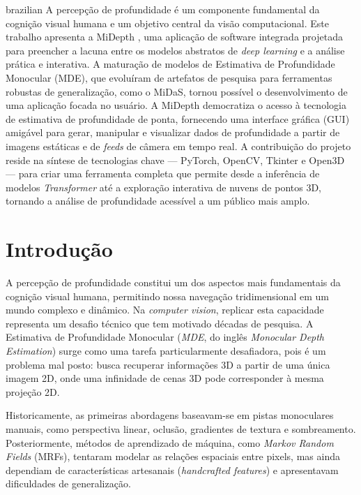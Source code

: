\documentclass{SBCbookchapter}
\newcommand{\nomeProjeto}{MiDepth }
\begin{document}
    \begin{resumo}
        \begin{otherlanguage}
            {brazilian} A percepção de profundidade é um componente fundamental da
            cognição visual humana e um objetivo central da visão computacional.
            Este trabalho apresenta a \nomeProjeto, uma aplicação de software integrada
            projetada para preencher a lacuna entre os modelos abstratos de \textit{deep
            learning} e a análise prática e interativa. A maturação de modelos de
            Estimativa de Profundidade Monocular (MDE), que evoluíram de artefatos
            de pesquisa para ferramentas robustas de generalização, como o MiDaS,
            tornou possível o desenvolvimento de uma aplicação focada no usuário.
            A \nomeProjeto democratiza o acesso à tecnologia de estimativa de profundidade
            de ponta, fornecendo uma interface gráfica (GUI) amigável para gerar,
            manipular e visualizar dados de profundidade a partir de imagens estáticas
            e de \textit{feeds} de câmera em tempo real. A contribuição do projeto
            reside na síntese de tecnologias chave — PyTorch, OpenCV, Tkinter e
            Open3D — para criar uma ferramenta completa que permite desde a inferência
            de modelos \textit{Transformer} até a exploração interativa de nuvens
            de pontos 3D, tornando a análise de profundidade acessível a um público
            mais amplo.
        \end{otherlanguage}
    \end{resumo}

    \pagebreak

    \section{Introdução}
    A percepção de profundidade constitui um dos aspectos mais fundamentais da cognição
    visual humana, permitindo nossa navegação tridimensional em um mundo
    complexo e dinâmico. Na \textit{computer vision}, replicar esta capacidade
    representa um desafio técnico que tem motivado décadas de pesquisa. A Estimativa
    de Profundidade Monocular (\textit{MDE}, do inglês \textit{Monocular Depth
    Estimation}) surge como uma tarefa particularmente desafiadora, pois é um problema
    mal posto: busca recuperar informações 3D a partir de uma única imagem 2D,
    onde uma infinidade de cenas 3D pode corresponder à mesma projeção 2D.

    Historicamente, as primeiras abordagens baseavam-se em pistas monoculares
    manuais, como perspectiva linear, oclusão, gradientes de textura e sombreamento.
    Posteriormente, métodos de aprendizado de máquina, como \textit{Markov Random
    Fields} (MRFs), tentaram modelar as relações espaciais entre pixels, mas
    ainda dependiam de características artesanais (\textit{handcrafted features})
    e apresentavam dificuldades de generalização.
\end{document}
